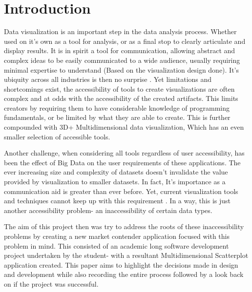\section{Introduction}


Data visualization is an important step in the data analysis process. Whether used on it's own as a tool for analysis, or as a final stop to clearly articulate and display results. It is in spirit a tool for communication, allowing abstract and complex ideas to be easily communicated to a wide audience, usually requiring minimal expertise to understand (Based on the visualization design done). It's ubiquity across all industries is then no surprise \cite{olshannikova_2015_visualizing}. Yet limitations and shortcomings exist, the accessibility of tools to create visualizations are often complex and at odds with the accessibility of the created artifacts. This limits creators by requiring them to have considerable knowledge of programming fundamentals, or be limited by what they are able to create. This is further compounded with 3D+ Multidimensional data visualization, Which has an even smaller selection of accessible tools.

Another challenge, when considering all tools regardless of user accessibility, has been the effect of Big Data on the user requirements of these applications. The ever increasing size and complexity of datasets doesn't invalidate the value provided by visualization to smaller datasets. In fact, It's importance as a communication aid is greater than ever before. Yet, current visualization tools and techniques cannot keep up with this requirement \cite{7918044}. In a way, this is just another accessibility problem- an inaccessibility of certain data types.

The aim of this project then was try to address the roots of these inaccessibility problems by creating a new market contender application focused with this problem in mind. This consisted of an academic long software development project undertaken by the student- with a resultant Multidimensional Scatterplot application created. This paper aims to highlight the decisions made in design and development while also recording the entire process followed by a look back on if the project was successful.










